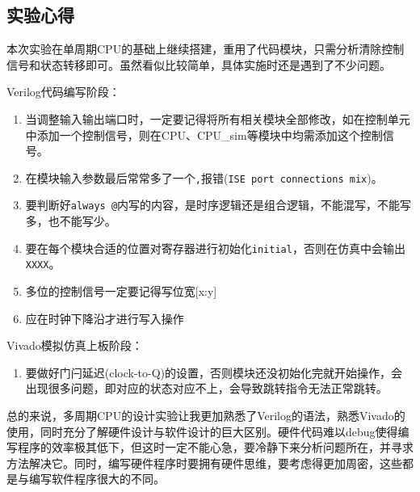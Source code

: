 \documentclass[12pt,UTF8]{ctexart}
\begin{document}
\begin{spacing}{1.1}
\section{实验心得}
\qquad 本次实验在单周期CPU的基础上继续搭建，重用了代码模块，只需分析清除控制信号和状态转移即可。虽然看似比较简单，具体实施时还是遇到了不少问题。
\par Verilog代码编写阶段：
\begin{enumerate}
    \item 当调整输入输出端口时，一定要记得将所有相关模块全部修改，如在控制单元中添加一个控制信号，则在CPU、CPU\_sim等模块中均需添加这个控制信号。
    \item 在模块输入参数最后常常多了一个\verb','报错(\verb'ISE port connections mix')。
    \item 要判断好\verb'always @'内写的内容，是时序逻辑还是组合逻辑，不能混写，不能写多，也不能写少。
    \item 要在每个模块合适的位置对寄存器进行初始化\verb'initial'，否则在仿真中会输出\verb'XXXX'。
    \item 多位的控制信号一定要记得写位宽[x:y]
    \item 应在时钟下降沿才进行写入操作
\end{enumerate}
\par Vivado模拟仿真上板阶段：
\begin{enumerate}
    \item 要做好门闩延迟(clock-to-Q)的设置，否则模块还没初始化完就开始操作，会出现很多问题，即对应的状态对应不上，会导致跳转指令无法正常跳转。
\end{enumerate}
\par 总的来说，多周期CPU的设计实验让我更加熟悉了Verilog的语法，熟悉Vivado的使用，同时充分了解硬件设计与软件设计的巨大区别。硬件代码难以debug使得编写程序的效率极其低下，但这时一定不能心急，要冷静下来分析问题所在，并寻求方法解决它。同时，编写硬件程序时要拥有硬件思维，要考虑得更加周密，这些都是与编写软件程序很大的不同。



\end{spacing}
\end{document}
